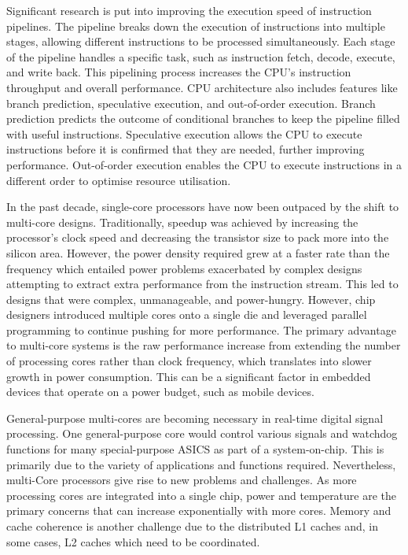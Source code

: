 Significant research is put into improving the execution speed of instruction pipelines. The pipeline breaks down the execution of instructions into multiple stages, allowing different instructions to be processed simultaneously. Each stage of the pipeline handles a specific task, such as instruction fetch, decode, execute, and write back. This pipelining process increases the CPU's instruction throughput and overall performance. CPU architecture also includes features like branch prediction, speculative execution, and out-of-order execution. Branch prediction predicts the outcome of conditional branches to keep the pipeline filled with useful instructions. Speculative execution allows the CPU to execute instructions before it is confirmed that they are needed, further improving performance. Out-of-order execution enables the CPU to execute instructions in a different order to optimise resource utilisation.

In the past decade, single-core processors have now been outpaced by the shift to multi-core designs. Traditionally, speedup was achieved by increasing the processor's clock speed and decreasing the transistor size to pack more into the silicon area. However, the power density required grew at a faster rate than the frequency which entailed power problems exacerbated by complex designs attempting to extract extra performance from the instruction stream. This led to designs that were complex, unmanageable, and power-hungry. However, chip designers introduced multiple cores onto a single die and leveraged parallel programming to continue pushing for more performance. The primary advantage to multi-core systems is the raw performance increase from extending the number of processing cores rather than clock frequency, which translates into slower growth in power consumption. This can be a significant factor in embedded devices that operate on a power budget, such as mobile devices. 

General-purpose multi-cores are becoming necessary in real-time digital signal processing. One general-purpose core would control various signals and watchdog functions for many special-purpose ASICS as part of a system-on-chip. This is primarily due to the variety of applications and functions required. Nevertheless, multi-Core processors give rise to new problems and challenges. As more processing cores are integrated into a single chip, power and temperature are the primary concerns that can increase exponentially with more cores. Memory and cache coherence is another challenge due to the distributed L1 caches and, in some cases, L2 caches which need to be coordinated.

